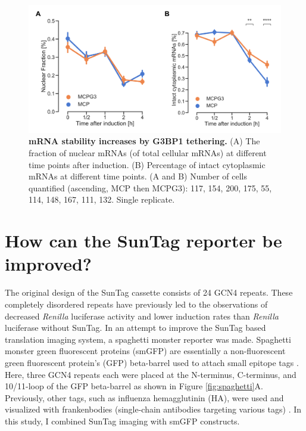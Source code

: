 \begin{figure}[h]
    \centering
    \includegraphics[width=\linewidth]{images/figure5}
    \caption{\textbf{mRNA stability increases by G3BP1 tethering.}
        (A) The fraction of nuclear mRNAs (of total cellular mRNAs)
            at different time points after induction.
        (B) Percentage of intact cytoplasmic mRNAs at different time points.
        (A and B) Number of cells quantified (ascending, MCP then MCPG3):
            117, 154, 200, 175, 55, 114, 148, 167, 111, 132. Single replicate.
    }
    \label{fig:mcp_treat}
\end{figure}


\pagebreak
\section{How can the SunTag reporter be improved?} \label{spaghetti}

The original design of the SunTag cassette consists of 24 GCN4 repeats.
These completely disordered repeats have previously led to the observations of decreased \textit{Renilla} luciferase activity and lower induction rates than \textit{Renilla} luciferase without SunTag.
In an attempt to improve the SunTag based translation imaging system, a spaghetti monster reporter was made.
Spaghetti monster green fluorescent proteins (smGFP) are essentially a non-fluorescent green fluorescent protein's (GFP) beta-barrel used to attach small epitope tags \cite{viswanathan_high-performance_2015}.
Here, three GCN4 repeats each were placed at the N-terminus, C-terminus, and 10/11-loop of the GFP beta-barrel as shown in Figure \ref{fig:spaghetti}A.
Previously, other tags, such as influenza hemagglutinin (HA), were used and visualized with frankenbodies (single-chain antibodies targeting various tags) \cite{zhao_genetically_2019}.
In this study, I combined SunTag imaging with smGFP constructs.

